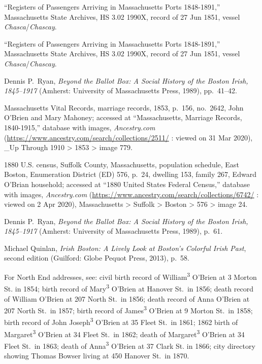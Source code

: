 \begin{thebibliography}{999}
``Registers of Passengers Arriving in Massachusetts Ports 1848-1891,'' Massachusetts State Archives, HS 3.02 1990X, record of 27 Jun 1851, vessel \textit{Chasca}/\textit{Chascay}.

``Registers of Passengers Arriving in Massachusetts Ports 1848-1891,'' Massachusetts State Archives, HS 3.02 1990X, record of 27 Jun 1851, vessel \textit{Chasca}/\textit{Chascay}.

Dennis P.\ Ryan, \textit{Beyond the Ballot Box: A Social History of the Boston Irish, 1845--1917} (Amherst: University of Massachusetts Press, 1989), pp.\ 41--42.

Massachusetts Vital Records, marriage records, 1853, p.\ 156, no.\ 2642, John O'Brien and Mary Mahoney; accessed at ``Massachusetts, Marriage Records, 1840-1915,'' database with images, \textit{Ancestry.com} (\url{https://www.ancestry.com/search/collections/2511/} : viewed on 31 Mar 2020), \_Up Through 1910 > 1853 > image 779.

1880 U.S. census, Suffolk County, Massachusetts, population schedule, East Boston, Enumeration District (ED) 576, p.\ 24, dwelling 153, family 267, Edward O'Brian household; accessed at ``1880 United States Federal Census,'' database with images, \textit{Ancestry.com} (\url{https://www.ancestry.com/search/collections/6742/} : viewed on 2 Apr 2020), Massachusetts > Suffolk > Boston > 576 > image 24.

Dennis P.\ Ryan, \textit{Beyond the Ballot Box: A Social History of the Boston Irish, 1845--1917} (Amherst: University of Massachusetts Press, 1989), p.\ 61.

Michael Quinlan, \textit{Irish Boston: A Lively Look at Boston's Colorful Irish Past}, second edition (Guilford: Globe Pequot Press, 2013), p.\ 58.

For North End addresses, see: civil birth record of William\textsuperscript{3} O'Brien at 3 Morton St. in 1854; birth record of Mary\textsuperscript{3} O'Brien at Hanover St.\ in 1856; death record of William O'Brien at 207 North St.\ in 1856; death record of Anna O'Brien at 207 North St.\ in 1857; birth record of James\textsuperscript{3} O'Brien at 9 Morton St.\ in 1858; birth record of John Joseph\textsuperscript{3} O'Brien at 35 Fleet St.\ in 1861; 1862 birth of Margaret\textsuperscript{3} O'Brien at 34 Fleet St.\ in 1862; death of Margaret\textsuperscript{3}  O'Brien at 34 Fleet St.\ in 1863; death of Anna\textsuperscript{3} O'Brien at 37 Clark St. in 1866; city directory showing Thomas Bowser living at 450 Hanover St.\ in 1870.


\end{thebibliography}
